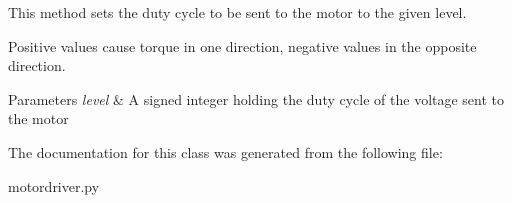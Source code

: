 This method sets the duty cycle to be sent to the motor to the given level. 

Positive values cause torque in one direction, negative values in the opposite direction. 
\begin{DoxyParams}{Parameters}
{\em level} & A signed integer holding the duty cycle of the voltage sent to the motor \\
\hline
\end{DoxyParams}


The documentation for this class was generated from the following file\+:\begin{DoxyCompactItemize}
\item 
motordriver.\+py\end{DoxyCompactItemize}
